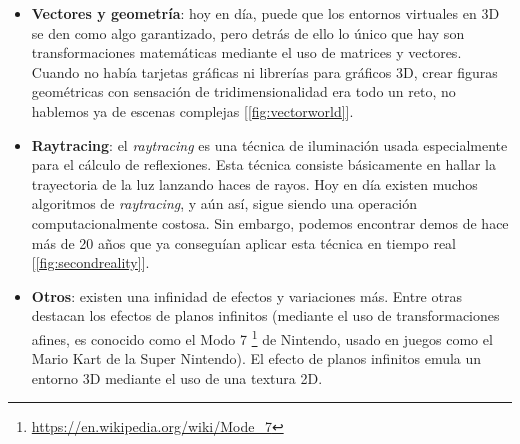 \begin{itemize}
	\item \textbf{Vectores y geometría}: hoy en día, puede que los entornos virtuales en 3D se den como algo garantizado, pero detrás de ello lo único que hay son transformaciones matemáticas mediante el uso de matrices y vectores. Cuando no había tarjetas gráficas ni librerías para gráficos 3D, crear figuras geométricas con sensación de tridimensionalidad era todo un reto, no hablemos ya de escenas complejas [\ref{fig:vectorworld}].
	\item \textbf{Raytracing}: el \emph{raytracing} es una técnica de iluminación usada especialmente para el cálculo de reflexiones. Esta técnica consiste básicamente en hallar la trayectoria de la luz lanzando haces de rayos. Hoy en día existen muchos algoritmos de \emph{raytracing}, y aún así, sigue siendo una operación computacionalmente costosa. Sin embargo, podemos encontrar demos de hace más de 20 años que ya conseguían aplicar esta técnica en tiempo real [\ref{fig:secondreality}].
	\item \textbf{Otros}: existen una infinidad de efectos y variaciones más. Entre otras destacan los efectos de planos infinitos (mediante el uso de transformaciones afines, es conocido como el Modo 7 \footnote{\url{https://en.wikipedia.org/wiki/Mode_7}} de Nintendo, usado en juegos como el Mario Kart de la Super Nintendo). El efecto de planos infinitos emula un entorno 3D mediante el uso de una textura 2D.
\end{itemize}

